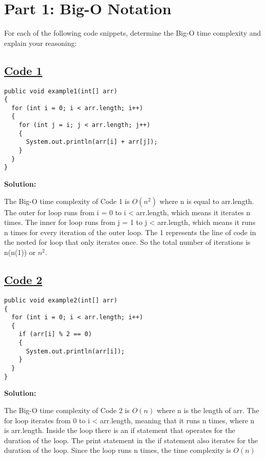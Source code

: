 \documentclass{article}
\begin{document}
\pagestyle{fancy}

\fancyhf{} %
\renewcommand{\headrulewidth}{0pt}
\rfoot{\thepage}

\newenvironment{myindentpar}[1]%
 {\begin{list}{}%
         {\setlength{\leftmargin}{#1}}%
         \item[]%
 }
 {\end{list}}

\section*{Part 1: Big-O Notation}
For each of the following code snippets, determine the Big-O time complexity and explain your reasoning:
\subsection*{\underline {Code 1}}

\begin{lstlisting}
public void example1(int[] arr) 
{
  for (int i = 0; i < arr.length; i++) 
  {
    for (int j = i; j < arr.length; j++) 
    {
      System.out.println(arr[i] + arr[j]);
    } 
  }
}
\end{lstlisting}
\textbf{Solution:}
\begin{myindentpar}{.5cm}
The Big-O time complexity of Code 1 is \(O(n^2)\) where n is equal to arr.length. The outer for loop runs from i = 0 to i < arr.length, which means it iterates n times. The inner for loop runs from j = 1 to j < arr.length, which means it runs n times for every iteration of the outer loop. The 1 represents the line of code in the nested for loop that only iterates once. So the total number of iterations is n(n(1)) or \(n^2\).
\end{myindentpar}

\subsection*{\underline{Code 2}}

\begin{lstlisting}
public void example2(int[] arr) 
{
  for (int i = 0; i < arr.length; i++) 
  {
    if (arr[i] % 2 == 0) 
    {
      System.out.println(arr[i]);
    }
  }
}
\end{lstlisting}
\textbf{Solution:} 
\begin{myindentpar}{.5cm}
The Big-O time complexity of Code 2 is \(O(n)\) where n is the length of arr. The for loop iterates from 0 to i < arr.length, meaning that it runs n times, where n is arr.length. Inside the loop there is an if statement that operates for the duration of the loop. The print statement in the if statement also iterates for the duration of the loop. Since the loop runs n times, the time complexity is \(O(n)\)
\end{myindentpar}
\end{document}
